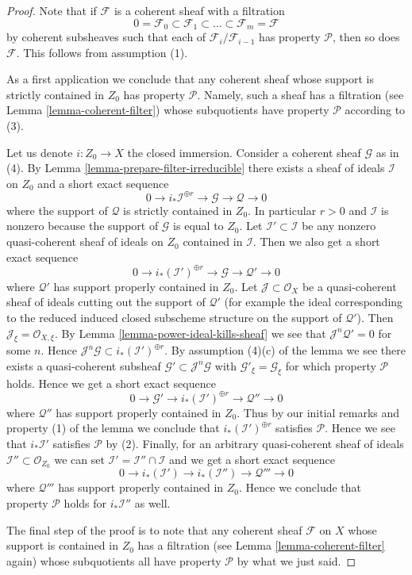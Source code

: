 \documentclass[10pt,a4paper]{amsart}
\theoremstyle{plain}
\theoremstyle{definition}
\theoremstyle{remark}
\numberwithin{equation}{subsection}
\begin{document}
\begin{proof}
Note that if $\mathcal{F}$ is a coherent sheaf with a filtration
$$
0 = \mathcal{F}_0 \subset \mathcal{F}_1 \subset
\ldots \subset \mathcal{F}_m = \mathcal{F}
$$
by coherent subsheaves such that each of $\mathcal{F}_i/\mathcal{F}_{i - 1}$
has property $\mathcal{P}$, then so does $\mathcal{F}$.
This follows from assumption (1).

\medskip\noindent
As a first application we conclude that any coherent sheaf whose support
is strictly contained in $Z_0$ has property $\mathcal{P}$. Namely, such a
sheaf has a filtration (see Lemma \ref{lemma-coherent-filter})
whose subquotients have property $\mathcal{P}$ according to (3).

\medskip\noindent
Let us denote $i : Z_0 \to X$ the closed immersion.
Consider a coherent sheaf $\mathcal{G}$ as in (4).
By Lemma \ref{lemma-prepare-filter-irreducible}
there exists a sheaf of ideals $\mathcal{I}$ on $Z_0$ and
a short exact sequence
$$
0 \to
i_*\mathcal{I}^{\oplus r} \to
\mathcal{G} \to
\mathcal{Q} \to 0
$$
where the support of $\mathcal{Q}$ is strictly contained in $Z_0$.
In particular $r > 0$ and $\mathcal{I}$ is nonzero
because the support of $\mathcal{G}$ is equal to $Z_0$.
Let $\mathcal{I}' \subset \mathcal{I}$ be any nonzero quasi-coherent
sheaf of ideals on $Z_0$ contained in $\mathcal{I}$.
Then we also get a short exact sequence
$$
0 \to
i_*(\mathcal{I}')^{\oplus r} \to
\mathcal{G} \to
\mathcal{Q}' \to 0
$$
where $\mathcal{Q}'$ has support properly contained in $Z_0$.
Let $\mathcal{J} \subset \mathcal{O}_X$ be a quasi-coherent sheaf
of ideals cutting out the support of $\mathcal{Q}'$ (for example
the ideal corresponding to the reduced induced closed subscheme
structure on the support of $\mathcal{Q}'$). Then
$\mathcal{J}_\xi = \mathcal{O}_{X, \xi}$. By
Lemma \ref{lemma-power-ideal-kills-sheaf}
we see that $\mathcal{J}^n\mathcal{Q}' = 0$ for some $n$.
Hence $\mathcal{J}^n\mathcal{G} \subset i_*(\mathcal{I}')^{\oplus r}$.
By assumption (4)(c) of the lemma we see there exists
a quasi-coherent subsheaf $\mathcal{G}' \subset \mathcal{J}^n\mathcal{G}$
with $\mathcal{G}'_\xi = \mathcal{G}_\xi$
for which property $\mathcal{P}$ holds.
Hence we get a short exact sequence
$$
0 \to \mathcal{G}' \to
i_*(\mathcal{I}')^{\oplus r} \to
\mathcal{Q}'' \to 0
$$
where $\mathcal{Q}''$ has support properly contained in $Z_0$.
Thus by our initial remarks and property (1) of the lemma
we conclude that $i_*(\mathcal{I}')^{\oplus r}$ satisfies
$\mathcal{P}$. Hence we see that $i_*\mathcal{I}'$ satisfies
$\mathcal{P}$ by (2). Finally, for an arbitrary quasi-coherent
sheaf of ideals $\mathcal{I}'' \subset \mathcal{O}_{Z_0}$ we can set
$\mathcal{I}' = \mathcal{I}'' \cap \mathcal{I}$ and we get
a short exact sequence
$$
0 \to
i_*(\mathcal{I}') \to
i_*(\mathcal{I}'') \to
\mathcal{Q}''' \to 0
$$
where $\mathcal{Q}'''$ has support properly contained in $Z_0$.
Hence we conclude that property $\mathcal{P}$ holds for
$i_*\mathcal{I}''$ as well.

\medskip\noindent
The final step of the proof is to note that any coherent sheaf
$\mathcal{F}$ on $X$ whose support is contained in $Z_0$ has a filtration
(see Lemma \ref{lemma-coherent-filter} again) whose subquotients
all have property $\mathcal{P}$ by what we just said.
\end{proof}
\end{document}
